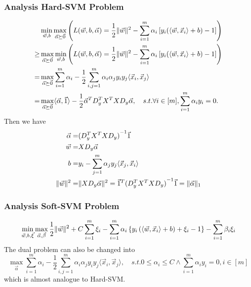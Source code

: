 \subsubsection{Analysis Hard-SVM Problem}%
\label{ssub:analysis_svm_problem}

\begin{align*}
    &\min_{\vec{w}, b} \max_{\vec{\alpha} \succeq \vec{0}} \left(L(\vec{w}, b, \vec{\alpha}) = \frac{1}{2} \Arrowvert \vec{w} \Arrowvert^2 - \sum^{m}_{i=1} \alpha_i \left[ y_i( \langle \vec{w}, \vec{x}_i \rangle + b) - 1 \right] \right)\\
    \ge& \max_{\vec{\alpha} \succeq \vec{0}} \min_{\vec{w}, b} \left(L(\vec{w}, b, \vec{\alpha}) = \frac{1}{2} \Arrowvert \vec{w} \Arrowvert^2 - \sum^{m}_{i=1} \alpha_i \left[ y_i( \langle \vec{w}, \vec{x}_i \rangle + b) - 1 \right] \right)\\
    =& \max_{\vec{\alpha} \succeq \vec{0}} \sum^{m}_{i=1} \alpha_i - \frac{1}{2} \sum^{m}_{i,j = 1} \alpha_i \alpha_j y_i y_j \langle \vec{x}_i, \vec{x}_j \rangle \\
    =& \max_{\vec{\alpha} \succeq \vec{0}} \langle  \vec{\alpha}, \vec{1} \rangle - \frac{1}{2} \vec{\alpha}^T D^T_y X^T X D_y \vec{\alpha},
    \quad s.t.\forall i \in [m], \sum^{m}_{i=1} \alpha_i y_i = 0.\\
\end{align*}
Then we have
\begin{align*}
    \vec{\alpha} =& {(D_y^T X^T X D_y)}^{-1} \vec{1}\\
    \vec{w} =& X D_y \vec{\alpha}\\
    b =& y_i - \sum^{m}_{j = 1} \alpha_j y_j \langle \vec{x}_j, \vec{x}_i \rangle\\
    \Arrowvert \vec{w} \Arrowvert^2 =& \Arrowvert XD_y \vec{\alpha} \Arrowvert^2
    = \vec{1}^T {{(D_y^T X^T X D_y)}^{-1}} \vec{1} = \Arrowvert \vec{\alpha} \Arrowvert_1
\end{align*}

\subsubsection{Analysis Soft-SVM Problem}%
\label{ssub:analysis_soft_svm_problem}

\[
    \min_{\vec{w}, b, \vec{\xi}} \max_{\vec{\alpha}, \vec{\beta}}
    \frac{1}{2} \Arrowvert \vec{w} \Arrowvert^2 + C \sum^{m}_{i=1} \xi_i - \sum^{m}_{i=1} \alpha_i \left\{ y_i \left( \langle \vec{w}, \vec{x}_i \rangle + b \right)+\xi_i - 1 \right\} - \sum^{m}_{i=1} \beta_i \xi_i
\]
The dual problem can also be changed into
\[
    \max_{\vec{\alpha}} \sum^{m}_{i=1} \alpha_i - \frac{1}{2} \sum^{m}_{i,j=1} \alpha_i \alpha_j y_i y_j \langle \vec{x}_i, \vec{x}_j \rangle,
    \quad s.t. 0\le \alpha_i \le C \wedge \sum^{m}_{i=1} \alpha_i y_i = 0, i \in [m]
\]
which is almost analogue to Hard-SVM.\@

